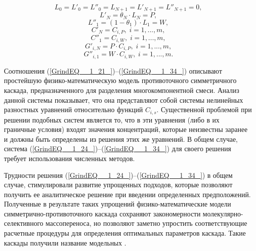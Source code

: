 \begin{equation} \label{GrindEQ__1_28_} 
  L_{0} =L'_{0} =L''_{0} =L_{N+1} =L'_{N+1} =L''_{N+1} =0, 
  \end{equation} 
  \begin{equation} \label{GrindEQ__1_29_} 
  L'_{N} =\theta _{N} \cdot L_{N} =P,        
  \end{equation} 
  \begin{equation} \label{GrindEQ__1_30_} 
  L''_{1} =(1-\theta _{1} )\cdot L_{1} =W,        
  \end{equation} 
  \begin{equation} \label{GrindEQ__1_31_} 
  C'_{N} =C_{i,P} ,\; i=1,...,m, 
  \end{equation} 
  \begin{equation} \label{GrindEQ__1_32_} 
  C''_{1} =C_{i,W} ,\; i=1,...,m, 
  \end{equation} 
  \begin{equation} \label{GrindEQ__1_33_} 
  G'_{i,N} =P \cdot C_{i,P} ,\; i=1,...,m, 
  \end{equation} 
  \begin{equation} \label{GrindEQ__1_34_} 
  G''_{i,1} =W \cdot C_{i,W} ,\; i=1,...,m. 
\end{equation} 

Соотношения (\ref{GrindEQ__1_21_})--(\ref{GrindEQ__1_34_}) описывают простейшую физико-математическую модель противоточного симметричного каскада, предназначенного для разделения многокомпонентной смеси. Анализ данной системы показывает, что она представляют собой системы нелинейных разностных уравнений относительно функций $C_{i,s}$. Существенной проблемой при решении подобных систем является то, что в эти уравнения (либо в их граничные условия) входят значения концентраций, которые неизвестны заранее и должны быть определены из решения этих же уравнений. В общем случае, система (\ref{GrindEQ__1_24_})--(\ref{GrindEQ__1_34_}) для своего решения требует использования численных методов.

Трудности решения (\ref{GrindEQ__1_24_})--(\ref{GrindEQ__1_34_}) в общем случае, стимулировали развитие упрощенных подходов, которые позволяют получить ее аналитическое решение при введении определенных предположений. Полученные в результате таких упрощений физико-математические модели симметрично-противоточного каскада сохраняют закономерности молекулярно-селективного массопереноса, но позволяют заметно упростить соответствующие расчетные процедуры для определения оптимальных параметров каскада. Такие каскады получили название модельных \cite{minenkoTeoriiKaskadovDlya1965, delagarzaMulticomponentIsotopeSeparation1961, zhigalovskiyLekcionnyeMaterialyPo1999, kolokoltsovDesignCascadesSeparating1970, kolokolcovVoprosuPostroeniiKaskadov1970, minenkoPredelnoeObogashcheniePromezhutochnyh1972, yamamotoMulticomponentIsotopeSeparating1978, wuStudyMulticomponentIsotope, borisevichRascheteKaskadovDopolnitelnym1993, woodCriterionEffiencyMultiisotope1999, sulaberidzeOsobennostiObogashcheniyaKomponentov2006, sazykinKvaziidealnyeKaskadyDlya2000, sulaberidzeSravnenieOptimalnyhModelnyh2008}.

